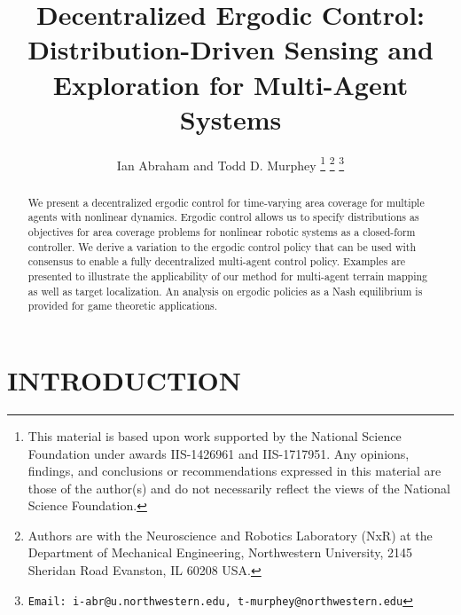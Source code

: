 \documentclass[letterpaper, 10 pt, conference]{ieeeconf}  %
\title{\LARGE \bf
Decentralized Ergodic Control: Distribution-Driven Sensing and Exploration for Multi-Agent Systems
}
\author{Ian Abraham and Todd D. Murphey
\thanks{This material is based upon work supported by the National Science Foundation under awards IIS-1426961 and IIS-1717951. Any opinions, findings, and conclusions or recommendations expressed in this material are those of the author(s) and do not necessarily reflect the views of the National Science Foundation.}%
\thanks{Authors are with the Neuroscience and Robotics Laboratory (NxR) at the Department of Mechanical Engineering, Northwestern University, 2145 Sheridan Road Evanston, IL 60208 USA.}
\thanks{{\tt\small Email: i-abr@u.northwestern.edu, t-murphey@northwestern.edu}}
}
\begin{document}
\maketitle
\thispagestyle{empty}
\pagestyle{empty}


\begin{abstract}
We present a decentralized ergodic control for time-varying area coverage for multiple agents with nonlinear dynamics.
Ergodic control allows us to specify distributions as objectives for area coverage problems for nonlinear robotic systems as a closed-form controller. 
We derive a variation to the ergodic control policy that can be used with consensus to enable a fully decentralized multi-agent control policy.
Examples are presented to illustrate the applicability of our method for multi-agent terrain mapping as well as target localization.
An analysis on ergodic policies as a Nash equilibrium is provided for game theoretic applications.
\end{abstract}


\section{INTRODUCTION}
\label{sec:introduction}

\end{document}
